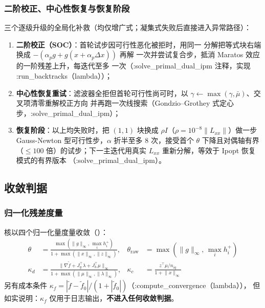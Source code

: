 \subsubsection*{二阶校正、中心性恢复与恢复阶段}
三个逐级升级的全局化补救（均仅增广式；凝集式失败后直接进入异常路径）：
\begin{enumerate}
  \item \textbf{二阶校正（SOC）}：首轮试步因可行性恶化被拒时，用同一
        分解把等式块右端换成 $-(\alpha_p g+g(x+\alpha_p\Delta x))$ 再解
        一次并尝试复合步，抵消 Maratos 效应的一阶残差上升，每迭代至多
        一次（:solve\_primal\_dual\_ipm 注释，实现 :run\_backtracks（lambda））；
  \item \textbf{中心性恢复重试}：滤波器全拒但首轮可行性尚可时，以
        $\gamma\leftarrow\max(\gamma,\bar\mu)$、交叉项清零重解校正方向
        并再跑一次线搜索（Gondzio--Grothey 式定心步，:solve\_primal\_dual\_ipm）；
  \item \textbf{恢复阶段}：以上均失败时，把 $(1,1)$ 块换成
        $\rho I$（$\rho=10^{-8}\lVert L_{xx}\rVert$）做一步 Gauss-Newton
        型可行性步，$\alpha$ 折半至多 8 次，接受首个
        $\theta$ 下降且对偶轴有界（$\le100$ 倍）的试步；下一主迭代用真实
        $L_{xx}$ 重新分解，等效于 Ipopt 恢复模式的有界版本
        （:solve\_primal\_dual\_ipm）。
\end{enumerate}

\subsection{收敛判据}\label{subsec:pipm-conv}

\subsubsection*{归一化残差度量}
核以四个归一化量度量收敛（）：
\begin{align*}
\theta &= \frac{\max(\lVert g\rVert_\infty,\,\max_i h_i^{+})}
               {1+\max(\lVert x\rVert_\infty,\lVert z\rVert_\infty)},
&
\theta_{\mathrm{raw}} &= \max(\lVert g\rVert_\infty,\,\max_i h_i^{+})\\
\kappa_d &= \frac{\lVert \nabla\tilde f+J_g^{\top}\lambda
            +J_h^{\top}\mu\rVert_\infty}
            {1+\max(\lVert\mu\rVert_\infty,\lVert\lambda\rVert_\infty)},
&
\kappa_c &= \frac{z^{\top}\mu/n_{iq}}{1+\lVert x\rVert_\infty}
\end{align*}
另有成本条件 $\kappa_f=|\tilde f-\tilde f_0|/(1+|\tilde f_0|)$（:compute\_convergence（lambda）），
但如实说明：$\kappa_f$ 仅用于日志输出，\textbf{不进入任何收敛判据}。

